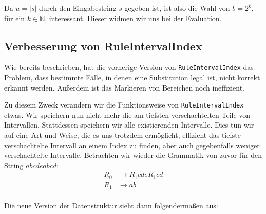 Da $u = |s|$ durch den Eingabestring $s$ gegeben ist, ist also die Wahl von $b = 2^k$, für ein $k \in \mathbb{N}$, interessant. Dieser widmen wir uns bei der Evaluation.

\subsection{Verbesserung von RuleIntervalIndex}

Wie bereits beschrieben, hat die vorherige Version von \texttt{RuleIntervalIndex} das Problem, dass bestimmte Fälle, in denen eine Substitution legal ist, nicht korrekt erkannt werden. Außerdem ist das Markieren von Bereichen noch ineffizient.  

Zu diesem Zweck verändern wir die Funktionsweise von \texttt{RuleIntervalIndex} etwas.
Wir speichern nun nicht mehr die am tiefsten verschachtelten Teile von Intervallen. Stattdessen speichern wir alle existierenden Intervalle. Dies tun wir auf eine Art und Weise, die es uns trotzdem ermöglicht, effizient das tiefste verschachtelte Intervall an einem Index zu finden, aber auch gegebenfalls weniger verschachtelte Intervalle. Betrachten wir wieder die Grammatik von zuvor für den String $abcdeabcd$:
\begin{align*}
	R_0 &\rightarrow R_1 c d e R_1 c d\\
	R_1 &\rightarrow a b\\
\end{align*}

Die neue Version der Datenstruktur sieht dann folgendermaßen aus:



\begin{figure}[H]
    \centering
\end{figure}


